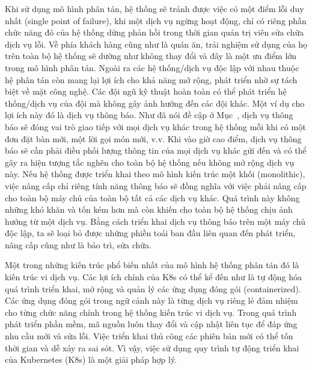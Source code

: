 Khi sử dụng mô hình phân tán, hệ thống sẽ tránh được việc có một điểm lỗi duy nhất (single point of failure), khi một dịch vụ ngừng hoạt động, chỉ có riêng phần chức năng đó của hệ thống dừng phản hồi trong thời gian quản trị viên sửa chữa dịch vụ lỗi.
Về phía khách hàng cũng như là quán ăn, trải nghiệm sử dụng của họ trên toàn bộ hệ thống sẽ dường như không thay đổi và đây là một ưu điểm lớn trong mô hình phân tán.
Ngoài ra các hệ thống/dịch vụ độc lập với nhau thuộc hệ phân tán còn mang lại lợi ích cho khả năng mở rộng, phát triển nhờ sự tách biệt về mặt công nghệ.
Các đội ngũ kỹ thuật hoàn toàn có thể phát triển hệ thống/dịch vụ của đội mà không gây ảnh hưởng đến các đội khác.
Một ví dụ cho lợi ích này đó là dịch vụ thông báo.
Như đã nói đề cập ở Mục~, dịch vụ thông báo sẽ đóng vai trò giao tiếp với mọi dịch vụ khác trong hệ thống mỗi khi có một đơn đặt bàn mới, một lời gọi món mới, v.v.
Khi vào giờ cao điểm, dịch vụ thông báo sẽ cần phải điều phối lượng thông tin của mọi dịch vụ khác gửi đến và có thể gây ra hiện tượng tắc nghẽn cho toàn bộ hệ thống nếu không mở rộng dịch vụ này.
Nếu hệ thống được triển khai theo mô hình kiến trúc một khối (monolithic), việc nâng cấp chỉ riêng tính năng thông báo sẽ đồng nghĩa với việc phải nâng cấp cho toàn bộ máy chủ của toàn bộ tất cả các dịch vụ khác.
Quá trình này không những khó khăn và tốn kém hơn mà còn khiến cho toàn bộ hệ thống chịu ảnh hưởng từ một dịch vụ.
Bằng cách triển khai dịch vụ thông báo trên một máy chủ độc lập, ta sẽ loại bỏ được những phiền toái ban đầu liên quan đến phát triển, nâng cấp cũng như là bảo trì, sửa chữa.

Một trong những kiến trúc phổ biến nhất của mô hình hệ thống phân tán đó là kiến trúc vi dịch vụ.
Các lợi ích chính của K8s có thể kể đến như là tự động hóa quá trình triển khai, mở rộng và quản lý các ứng dụng đóng gói (containerized).
Các ứng dụng đóng gói trong ngữ cảnh này là từng dịch vụ riêng lẻ đảm nhiệm cho từng chức năng chính trong hệ thống kiến trúc vi dịch vụ.
Trong quá trình phát triển phần mềm, mã nguồn luôn thay đổi và cập nhật liên tục để đáp ứng nhu cầu mới và sửa lỗi.
Việc triển khai thủ công các phiên bản mới có thể tốn thời gian và dễ xảy ra sai sót.
Vì vậy, việc sử dụng quy trình tự động triển khai của Kubernetes (K8s) là một giải pháp hợp lý.

